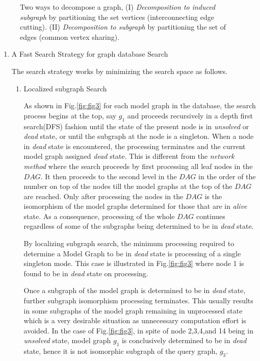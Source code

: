 \begin{figure}

\centering

\caption{Two ways to decompose a graph, (I) \textit{Decomposition to induced subgraph} by partitioning the set vertices (interconnecting edge cutting). 
(II) \textit{Decomposition to subgraph} by partitioning the set of edges (common vertex sharing).}
\label{fig:fig55}
\end{figure}

\begin{enumerate}

\item A Fast Search Strategy for graph database Search

The search strategy works by minimizing the search space as follows.
\begin{enumerate}
\item{Localized subgraph Search}

As shown in Fig.\ref{fig:fig3} for each model graph in the database, the search process begins at the top, say $g_1$ and proceeds recursively in a depth first search(DFS) fashion until the state of the present node is in \textit{unsolved} or \textit{dead} state, or until the subgraph at the node is a singleton. 
When a node in \textit{dead} state is encountered, the processing terminates and the current model graph assigned \textit{dead} state. 
This is different from the \textit{network method} where the search proceeds by first processing all leaf nodes in the $DAG$. 
It then proceeds to the second level in the $DAG$ in the order of the number on top of the nodes till the model graphs at the top of the $DAG$ are reached. 
Only after processing the nodes in the $DAG$ is the isomorphism of the model graphs determined for those that are in  \textit{alive} state. 
As a consequence, processing of the whole $DAG$ continues regardless of some of the subgraphs being determined to be in \textit{dead} state.

By localizing subgraph search, the minimum processing required to determine a Model Graph to be in \textit{dead} state is processing of a single singleton mode. 
This case is illustrated in Fig.\ref{fig:fig3} where node 1 is found to be in \textit{dead} state on processing.


Once a subgraph of the model graph is determined to be in \textit{dead} state, further subgraph isomorphism processing terminates. 
This usually results in some subgraphs of the model graph remaining in unprocessed state which is a very desirable situation as unnecessary computation effort is avoided. 
In the case of Fig.\ref{fig:fig3}, in spite of node 2,3,4,and 14 being in \textit{unsolved} state, model graph $g_1$ is conclusively determined to be in \textit{dead} state, hence it is not isomorphic subgraph of the query graph, $g_3$.


\end{enumerate}
\end{enumerate}
